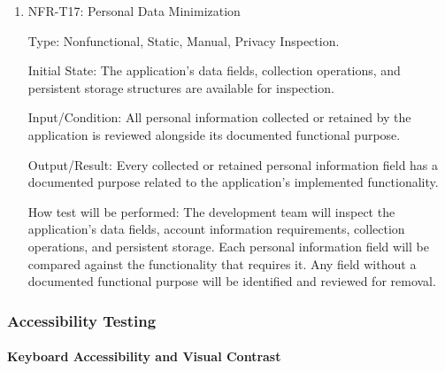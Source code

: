 \documentclass[12pt, titlepage]{article}
\begin{document}
\begin{enumerate}
Initial State: The application source code and application-controlled
persistent storage are available for inspection.

Input/Condition: Authentication-related information is examined
in the application's persistent storage and relevant storage
operations.

Output/Result: No authentication secrets are found stored in
plaintext within application-controlled persistent storage.

How test will be performed: The development team will inspect
the application's persistent storage, including relevant local
storage and database records. Checking if any authentication-related values
are stored in plaintext. The inspection results will be documented.

\item{NFR-T17: Personal Data Minimization\\}

Type: Nonfunctional, Static, Manual, Privacy Inspection.

Initial State: The application's data fields, collection operations,
and persistent storage structures are available for inspection.

Input/Condition: All personal information collected or retained
by the application is reviewed alongside its documented functional
purpose.

Output/Result: Every collected or retained personal information
field has a documented purpose related to the application's
implemented functionality.

How test will be performed: The development team will inspect
the application's data fields, account information requirements,
collection operations, and persistent storage. Each personal
information field will be compared against the functionality
that requires it. Any field without a documented functional
purpose will be identified and reviewed for removal.

\end{enumerate}


\subsubsection{Accessibility Testing}

\paragraph{Keyboard Accessibility and Visual Contrast}
\end{document}
